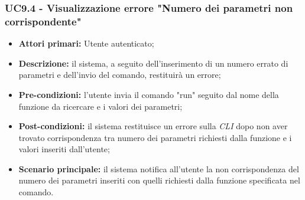 \subsubsection{UC9.4 - Visualizzazione errore "Numero dei parametri non corrispondente"}
\begin{itemize}
	\item \textbf{Attori primari:} Utente autenticato;
	\item \textbf{Descrizione:} il sistema, a seguito dell'inserimento di un numero errato di parametri e dell'invio del comando, restituirà un errore; 
	\item \textbf{Pre-condizioni:} l'utente invia il comando "run" seguito dal nome della funzione da ricercare e i valori dei parametri;
	\item \textbf{Post-condizioni:} il sistema restituisce un errore sulla \textit{CLI\glo} dopo non aver trovato corrispondenza tra numero dei parametri richiesti dalla funzione e i valori inseriti dall'utente;
	\item \textbf{Scenario principale:} il sistema notifica all'utente la non corrispondenza del numero dei parametri inseriti con quelli richiesti dalla funzione specificata nel comando.
\end{itemize}

